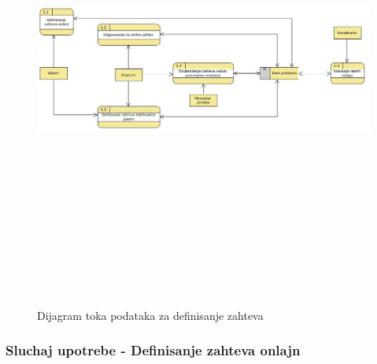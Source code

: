 \documentclass[10 pt]{article}
\begin{document}
	\begin{figure}[H]
		\centering
		\includegraphics[width=15cm,height=15cm,keepaspectratio]{slike/DTPDefinisanjeZahteva.png}\\
		\caption{Dijagram toka podataka za definisanje zahteva}
	\end{figure}
	
	\subsubsection{Sluchaj upotrebe - Definisanje zahteva onlajn}
	
\end{document}
